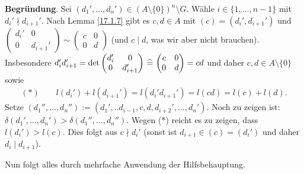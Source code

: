 \documentclass[../../main.tex]{subfiles}
\begin{document}
\begin{cproof}
\begin{tcolorbox}[arc=0mm, boxrule=0.2mm]
\noindent\textbf{Begründung}. Sei $(d_1',\ldots ,d_n')\in (A\setminus\{0\})^n\setminus G$. Wähle $i\in\{1,\ldots ,n-1\}$ mit $d_i'\nmid d_{i+1}'$. Nach Lemma \ref{17.1.7} gibt es $c,d\in A$ mit $(c)=(d_i',d_{i+1}')$ und $\begin{pmatrix*}d_i'&0\\ 0&d_{i+1}'\end{pmatrix*}\sim\begin{pmatrix*}c&0\\ 0&d\end{pmatrix*}$ (und $c\mid d$, was wir aber nicht brauchen). Insbesondere $d_i'd_{i+1}'=\det\begin{pmatrix*}d_i'&0\\ 0&d_{i+1}'\end{pmatrix*}\divi\begin{pmatrix*}c&0\\ 0&d\end{pmatrix*}=cd$ und daher $c,d\in A\setminus\{0\}$ sowie
\begin{align*}
(*)\qquad l(d_i')+l(d_{i+1}')=l(d_i'd_{i+1}')=l(cd)=l(c)+l(d).
\end{align*}
Setze $(d_1'',\ldots ,d_n''):=(d_1',..d_{i-1},c,d,d_{i+2}',\ldots ,d_n')$. Noch zu zeigen ist: $\delta(d_1',\ldots ,d_n')>\delta(d_1'',\ldots ,d_n'')$. Wegen (*) reicht es zu zeigen, dass $l(d_i')>l(c)$. Dies folgt aus $c\nmid d_i'$ (sonst ist $d_{i+1}\in (c)=(d_i')$ und daher $d_i\mid d_{i+1}$).\end{tcolorbox}

\noindent Nun folgt alles durch mehrfache Anwendung der Hilfsbehauptung.
\end{cproof}
\end{document}
